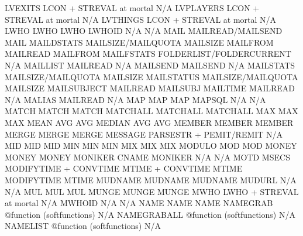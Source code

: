 \documentclass[letterpaper,10pt,english]{sphinxmanual}
\begin{document}
\begin{description}
LVEXITS                 LCON + STREVAL at mortal     N/A
LVPLAYERS               LCON + STREVAL at mortal     N/A
LVTHINGS                LCON + STREVAL at mortal     N/A
LWHO                    LWHO                         LWHO
LWHOID                  N/A                          N/A
MAIL                    MAILREAD/MAILSEND            MAIL
MAILDSTATS              MAILSIZE/MAILQUOTA           MAILSIZE
MAILFROM                MAILREAD                     MAILFROM
MAILFSTATS              FOLDERLIST/FOLDERCURRENT     N/A
MAILLIST                MAILREAD                     N/A
MAILSEND                MAILSEND                     N/A
MAILSTATS               MAILSIZE/MAILQUOTA           MAILSIZE
MAILSTATUS              MAILSIZE/MAILQUOTA           MAILSIZE
MAILSUBJECT             MAILREAD                     MAILSUBJ
MAILTIME                MAILREAD                     N/A
MALIAS                  MAILREAD                     N/A
MAP                     MAP                          MAP
MAPSQL                  N/A                          N/A
MATCH                   MATCH                        MATCH
MATCHALL                MATCHALL                     MATCHALL
MAX                     MAX                          MAX
MEAN                    AVG                          AVG
MEDIAN                  AVG                          AVG
MEMBER                  MEMBER                       MEMBER
MERGE                   MERGE                        MERGE
MESSAGE                 PARSESTR + PEMIT/REMIT       N/A
MID                     MID                          MID
MIN                     MIN                          MIN
MIX                     MIX                          MIX
MODULO                  MOD                          MOD
MONEY                   MONEY                        MONEY
MONIKER                 CNAME                        MONIKER
N/A                     N/A                          MOTD
MSECS                   MODIFYTIME + CONVTIME        MTIME + CONVTIME
MTIME                   MODIFYTIME                   MTIME
MUDNAME                 MUDNAME                      MUDNAME
MUDURL                  N/A                          N/A
MUL                     MUL                          MUL
MUNGE                   MUNGE                        MUNGE
MWHO                    LWHO + STREVAL at mortal     N/A
MWHOID                  N/A                          N/A
NAME                    NAME                         NAME
NAMEGRAB                @function (softfunctions)    N/A
NAMEGRABALL             @function (softfunctions)    N/A
NAMELIST                @function (softfunctions)    N/A

\end{description}
\end{document}

